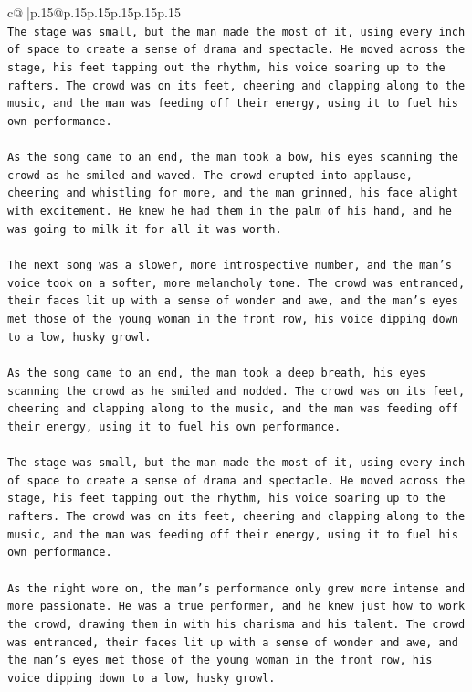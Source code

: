 \documentclass{article}
\begin{document}
{\begin{supertabular}{c@{$\;$}|p{.15\linewidth}@{}p{.15\linewidth}p{.15\linewidth}p{.15\linewidth}p{.15\linewidth}p{.15\linewidth}}
{{{\\ 
\texttt{The stage was small, but the man made the most of it, using every inch of space to create a sense of drama and spectacle. He moved across the stage, his feet tapping out the rhythm, his voice soaring up to the rafters. The crowd was on its feet, cheering and clapping along to the music, and the man was feeding off their energy, using it to fuel his own performance.} \\
\\ 
\texttt{As the song came to an end, the man took a bow, his eyes scanning the crowd as he smiled and waved. The crowd erupted into applause, cheering and whistling for more, and the man grinned, his face alight with excitement. He knew he had them in the palm of his hand, and he was going to milk it for all it was worth.} \\
\\ 
\texttt{The next song was a slower, more introspective number, and the man's voice took on a softer, more melancholy tone. The crowd was entranced, their faces lit up with a sense of wonder and awe, and the man's eyes met those of the young woman in the front row, his voice dipping down to a low, husky growl.} \\
\\ 
\texttt{As the song came to an end, the man took a deep breath, his eyes scanning the crowd as he smiled and nodded. The crowd was on its feet, cheering and clapping along to the music, and the man was feeding off their energy, using it to fuel his own performance.} \\
\\ 
\texttt{The stage was small, but the man made the most of it, using every inch of space to create a sense of drama and spectacle. He moved across the stage, his feet tapping out the rhythm, his voice soaring up to the rafters. The crowd was on its feet, cheering and clapping along to the music, and the man was feeding off their energy, using it to fuel his own performance.} \\
\\ 
\texttt{As the night wore on, the man's performance only grew more intense and more passionate. He was a true performer, and he knew just how to work the crowd, drawing them in with his charisma and his talent. The crowd was entranced, their faces lit up with a sense of wonder and awe, and the man's eyes met those of the young woman in the front row, his voice dipping down to a low, husky growl.} \\
\\ 
}}}
\end{supertabular}}
\end{document}
